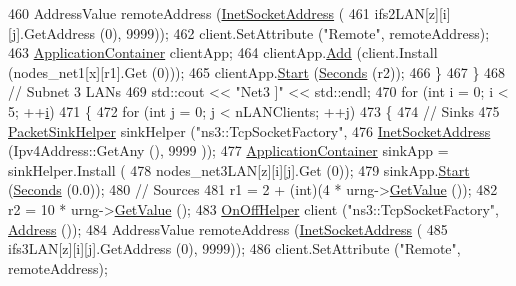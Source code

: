 \begin{DoxyCode}
460               AddressValue remoteAddress (\hyperlink{classns3_1_1InetSocketAddress}{InetSocketAddress} (
461                                             ifs2LAN[z][i][j].GetAddress (0), 9999));
462               client.SetAttribute (\textcolor{stringliteral}{"Remote"}, remoteAddress);
463               \hyperlink{classns3_1_1ApplicationContainer}{ApplicationContainer} clientApp;
464               clientApp.\hyperlink{classns3_1_1ApplicationContainer_ad09ab1a1ad5849d518d5f4c262e38152}{Add} (client.Install (nodes\_net1[x][r1].Get (0)));
465               clientApp.\hyperlink{classns3_1_1ApplicationContainer_a8eff87926507020bbe3e1390358a54a7}{Start} (\hyperlink{group__timecivil_ga33c34b816f8ff6628e33d5c8e9713b9e}{Seconds} (r2));
466             \}
467         \}
468       \textcolor{comment}{// Subnet 3 LANs}
469       std::cout << \textcolor{stringliteral}{"Net3 ]"} << std::endl;
470       \textcolor{keywordflow}{for} (\textcolor{keywordtype}{int} i = 0; i < 5; ++\hyperlink{bernuolliDistribution_8m_a6f6ccfcf58b31cb6412107d9d5281426}{i}) 
471         \{
472           \textcolor{keywordflow}{for} (\textcolor{keywordtype}{int} j = 0; j < nLANClients; ++j) 
473             \{
474               \textcolor{comment}{// Sinks}
475               \hyperlink{classns3_1_1PacketSinkHelper}{PacketSinkHelper} sinkHelper (\textcolor{stringliteral}{"ns3::TcpSocketFactory"},
476                                            \hyperlink{classns3_1_1InetSocketAddress}{InetSocketAddress} (Ipv4Address::GetAny (), 9999
      ));
477               \hyperlink{classns3_1_1ApplicationContainer}{ApplicationContainer} sinkApp = sinkHelper.Install (
478                   nodes\_net3LAN[z][i][j].Get (0));
479               sinkApp.\hyperlink{classns3_1_1ApplicationContainer_a8eff87926507020bbe3e1390358a54a7}{Start} (\hyperlink{group__timecivil_ga33c34b816f8ff6628e33d5c8e9713b9e}{Seconds} (0.0));
480               \textcolor{comment}{// Sources}
481               r1 = 2 + (int)(4 * urng->\hyperlink{classns3_1_1UniformRandomVariable_a03822d8c86ac51e9aa83bbc73041386b}{GetValue} ());
482               r2 = 10 * urng->\hyperlink{classns3_1_1UniformRandomVariable_a03822d8c86ac51e9aa83bbc73041386b}{GetValue} ();
483               \hyperlink{classns3_1_1OnOffHelper}{OnOffHelper} client (\textcolor{stringliteral}{"ns3::TcpSocketFactory"}, \hyperlink{classns3_1_1Address}{Address} ());
484               AddressValue remoteAddress (\hyperlink{classns3_1_1InetSocketAddress}{InetSocketAddress} (
485                                             ifs3LAN[z][i][j].GetAddress (0), 9999));
486               client.SetAttribute (\textcolor{stringliteral}{"Remote"}, remoteAddress);

\end{DoxyCode}
